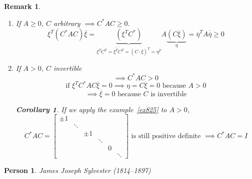 \documentclass{article}
\newcounter{lecref}[section]
\numberwithin{lecref}{section}
\newtheorem{remark}[lecref]{Remark}
\newtheorem{corollary}[lecref]{Corollary}
\newtheorem*{person}{Person}
\begin{document}
\begin{remark} %
  \begin{enumerate}
    \item If $A \geq 0$, $C$ arbitrary $\implies C^* AC \geq 0$.
      \[ \xi^T (C^* AC) \overline{\xi} = \underbrace{(\xi^T C^*)}_{\xi^T \overline{C^T} = \overline{\overline{\xi^T} C^T} = \overline{(C \cdot \overline{\xi})^T} = \overline{\eta^T}} A \underbrace{(C \overline{\xi})}_{\eta}
         = \overline{\eta}^T A \overline{\overline{\eta}} \geq 0
      \]
    \item If $A > 0$, $C$ invertible
      \[ \implies C^* AC > 0 \]
      \[ \text{if } \xi^T C^* AC \overline{\xi} = 0 \implies  \eta = C \overline{\xi} = 0 \text{ because } A > 0 \]
      \[ \implies \overline{\xi} = 0 \text{ because } C \text{ is invertible} \]

      \begin{corollary}
        If we apply the example~\ref{ex825} to $A>0$,
        \[
          C^* AC = \begin{bmatrix}
            \pm 1 &        &       &        &   & \\
                  & \ddots &       &        &   & \\
                  &        & \pm 1 &        &   & \\
                  &        &       & \ddots &   & \\
                  &        &       &        & 0 & \\
                  &        &       &        &   & \ddots
          \end{bmatrix}
          \text{ is still positive definite }
          \implies C^* AC = I
        \]
      \end{corollary}
  \end{enumerate}
\end{remark}

\begin{person}
  James Joseph Sylvester (1814--1897)
\end{person}
\end{document}
